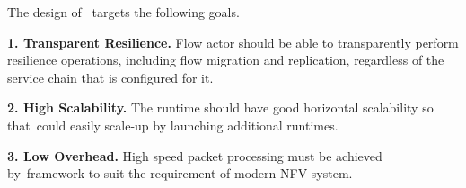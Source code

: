 

The design of \nfactor~targets the following goals. %

{\bf 1. Transparent Resilience.} Flow actor should be able to transparently perform resilience operations, including flow migration and replication, regardless of the service chain that is configured for it. %

{\bf 2. High Scalability.} The runtime should have good horizontal scalability so that~\nfactor could easily scale-up by launching additional runtimes.

{\bf 3. Low Overhead.} High speed packet processing must be achieved by~\nfactor framework to suit the requirement of modern NFV system.
